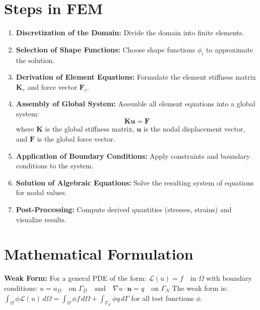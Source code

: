 \section{Steps in FEM}
\begin{enumerate}
    \item \textbf{Discretization of the Domain:} Divide the domain into finite elements.
    \item \textbf{Selection of Shape Functions:} Choose shape functions $\phi_i$ to approximate the solution.
    \item \textbf{Derivation of Element Equations:} Formulate the element stiffness matrix $\mathbf{K}_e$ and force vector $\mathbf{F}_e$.
    \item \textbf{Assembly of Global System:} Assemble all element equations into a global system:
    \[
    \mathbf{K} \mathbf{u} = \mathbf{F}
    \]
    where $\mathbf{K}$ is the global stiffness matrix, $\mathbf{u}$ is the nodal displacement vector, and $\mathbf{F}$ is the global force vector.
    \item \textbf{Application of Boundary Conditions:} Apply constraints and boundary conditions to the system.
    \item \textbf{Solution of Algebraic Equations:} Solve the resulting system of equations for nodal values.
    \item \textbf{Post-Processing:} Compute derived quantities (stresses, strains) and visualize results.
\end{enumerate}

\section{Mathematical Formulation}
\textbf{Weak Form:} For a general PDE of the form:
$\mathcal{L}(u) = f \quad \text{in } \Omega$
with boundary conditions:
$u = u_D \quad \text{on } \Gamma_D \quad \text{and} \quad \nabla u \cdot \mathbf{n} = q \quad \text{on } \Gamma_N$
The weak form is:
$\int_{\Omega} \phi \mathcal{L}(u) \, d\Omega = \int_{\Omega} \phi f \, d\Omega + \int_{\Gamma_N} \phi q \, d\Gamma$
for all test functions $\phi$.

